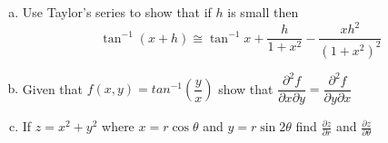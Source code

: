 \begin{enumerate}[(a)]
	\item Use Taylor's series to show that if $h$ is small then
	$$\tan^{-1}(x+h)\cong \tan^{-1}x + \frac{h}{1+x^{2}} - \frac{xh^{2}}{(1+x^2)^{2}} $$ 
	\item Given that $f(x,y) = tan^{-1}(\dfrac{y}{x})$ show that $\dfrac{\partial^{2}f}{\partial x \partial y} = \dfrac{\partial^{2} f}{\partial y \partial x}$ 
	\item If $z = x^{2} + y^{2}$ where $x = r\cos \theta$ and $y = r \sin 2\theta $ find $\frac{\partial z}{\partial r}$ and $\frac{\partial z}{\partial \theta}$ 
\end{enumerate}